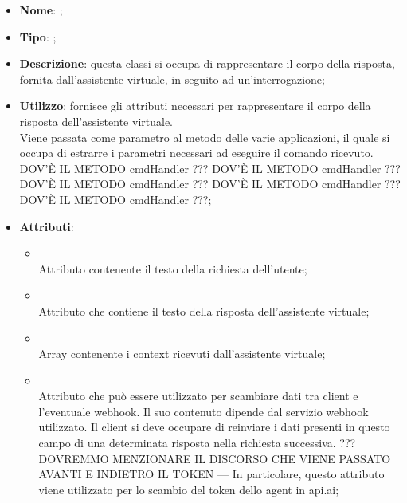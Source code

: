 \begin{itemize}
	\item \textbf{Nome}: ;
	\item \textbf{Tipo}: ;
	\item \textbf{Descrizione}: questa classi si occupa di rappresentare il corpo della risposta, fornita dall'assistente virtuale, in seguito ad un'interrogazione;
	\item \textbf{Utilizzo}: fornisce gli attributi necessari per rappresentare il corpo della risposta dell'assistente virtuale. \\
Viene passata come parametro al metodo  delle varie applicazioni, il quale si occupa di estrarre i parametri necessari ad eseguire il comando ricevuto.
DOV'È IL METODO cmdHandler ??? DOV'È IL METODO cmdHandler ??? DOV'È IL METODO cmdHandler ??? DOV'È IL METODO cmdHandler ??? DOV'È IL METODO cmdHandler ???;
	\item \textbf{Attributi}:
	\begin{itemize}
		\item[]  \\
		Attributo contenente il testo della richiesta dell'utente;
		\item[]  \\
		Attributo che contiene il testo della risposta dell'assistente virtuale;
		\item[]  \\
		Array contenente i context ricevuti dall'assistente virtuale;
		\item[]  \\
		Attributo che può essere utilizzato per scambiare dati tra client e l'eventuale webhook. Il suo contenuto dipende dal servizio webhook utilizzato. Il client si deve occupare di reinviare i dati presenti in questo campo di una determinata risposta nella richiesta successiva. ??? DOVREMMO MENZIONARE IL DISCORSO CHE VIENE PASSATO AVANTI E INDIETRO IL TOKEN
---
In particolare, questo attributo viene utilizzato per lo scambio del token dello agent in api.ai;
	\end{itemize}
\end{itemize}

